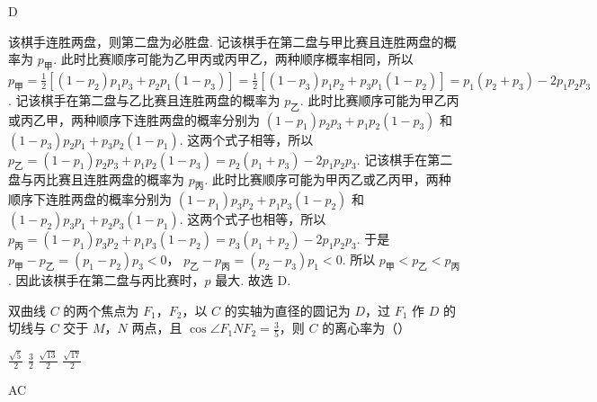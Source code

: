 \begin{answer}
D
\end{answer}

\begin{solution}
该棋手连胜两盘，则第二盘为必胜盘.
记该棋手在第二盘与甲比赛且连胜两盘的概率为 \(p_{\text{甲}}\). 此时比赛顺序可能为乙甲丙或丙甲乙，两种顺序概率相同，所以 \(p_{\text{甲}}=\frac{1}{2}\left[ \left( 1-p_2 \right)p_1p_3+p_2p_1\left( 1-p_3 \right) \right]=\frac{1}{2}\left[ \left( 1-p_3 \right)p_1p_2+p_3p_1\left( 1-p_2 \right) \right]=p_1\left( p_2+p_3 \right)-2p_1p_2p_3\).
记该棋手在第二盘与乙比赛且连胜两盘的概率为 \(p_{\text{乙}}\). 此时比赛顺序可能为甲乙丙或丙乙甲，两种顺序下连胜两盘的概率分别为 \(\left( 1-p_1 \right)p_2p_3+p_1p_2\left( 1-p_3 \right)\) 和 \(\left( 1-p_3 \right)p_2p_1+p_3p_2\left( 1-p_1 \right)\). 这两个式子相等，所以 \(p_{\text{乙}}=\left( 1-p_1 \right)p_2p_3+p_1p_2\left( 1-p_3 \right)=p_2\left( p_1+p_3 \right)-2p_1p_2p_3\).
记该棋手在第二盘与丙比赛且连胜两盘的概率为 \(p_{\text{丙}}\). 此时比赛顺序可能为甲丙乙或乙丙甲，两种顺序下连胜两盘的概率分别为 \(\left( 1-p_1 \right)p_3p_2+p_1p_3\left( 1-p_2 \right)\) 和 \(\left( 1-p_2 \right)p_3p_1+p_2p_3\left( 1-p_1 \right)\). 这两个式子也相等，所以 \(p_{\text{丙}}=\left( 1-p_1 \right)p_3p_2+p_1p_3\left( 1-p_2 \right)=p_3\left( p_1+p_2 \right)-2p_1p_2p_3\).
于是
\(p_{\text{甲}}-p_{\text{乙}} =\left( p_1-p_2 \right)p_3<0\)，
\(p_{\text{乙}}-p_{\text{丙}} =\left( p_2-p_3 \right)p_1<0\).
所以
\(p_{\text{甲}}<p_{\text{乙}}<p_{\text{丙}}\).
因此该棋手在第二盘与丙比赛时，\(p\) 最大.
故选 D.
\end{solution}

\begin{problem}
双曲线 \(C\) 的两个焦点为 \(F_1\)，\(F_2\)，以 \(C\) 的实轴为直径的圆记为 \(D\)，过 \(F_1\) 作 \(D\) 的切线与 \(C\) 交于 \(M\)，\(N\) 两点，且 \(\cos \angle F_1NF_2=\frac{3}{5}\)，则 \(C\) 的离心率为（\quad）

\choices
    {\(\frac{\sqrt{5}}{2}\)}
    {\(\frac{3}{2}\)}
    {\(\frac{\sqrt{13}}{2}\)}
    {\(\frac{\sqrt{17}}{2}\)}
\end{problem}

\begin{answer}
AC
\end{answer}

